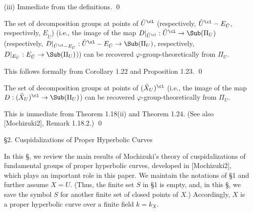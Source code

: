 \noindent
(iii) Immediate from the definitions. 
\qed
\enddemo

The set of decomposition groups at points of ${\tilde U}^{\cl}$ 
(respectively, ${\tilde U}^{\cl}- E_{\tilde U}$, respectively, $E_{\tilde U}$) 
(i.e., the image of the 
map 
$D|_{{\tilde U}^{\cl}}: {\tilde U}^{\cl} \to \Sub(\Pi_U)$ 
(respectively, 
$D|_{{\tilde U}^{\cl}-E_{\tilde U}}: {\tilde U}^{\cl}-E_{\tilde U} \to \Sub(\Pi_U)$, 
respectively, 
$D|_{E_{\tilde U}}: E_{\tilde U} \to \Sub(\Pi_U)$))
can be recovered $\varphi$-group-theoretically from $\Pi_U$. 
\endproclaim

 This follows formally from Corollary 1.22 and Proposition 1.23. 
\qed\enddemo

The set of decomposition groups at points of $({\tilde X}_U)^{\cl}$ 
(i.e., the image of the 
map 
$D: ({\tilde X}_U)^{\cl} \to \Sub(\Pi_U)$) 
can be recovered $\varphi$-group-theoretically from $\Pi_U$. 
\endproclaim

 This is immediate from Theorem 1.18(ii) and Theorem 1.24. 
(See also [Mochizuki2], Remark 1.18.2.) 
\qed\enddemo


\subhead
\S 2. %
Cuspidalizations of Proper Hyperbolic Curves
\endsubhead

In this \S, we review the main results of Mochizuki's theory 
of cuspidalizations of fundamental groups of proper hyperbolic curves, 
developed in [Mochizuki2], which plays an important role in this paper. 
We maintain the notations of \S 1 and further assume 
$X=U$. (Thus, the finite set $S$ in \S 1 is empty, and, in this \S, 
we save the symbol $S$ for another finite set of closed points of $X$.) 
Accordingly, $X$ is a proper hyperbolic curve over a finite field 
$k=k_X$. 


